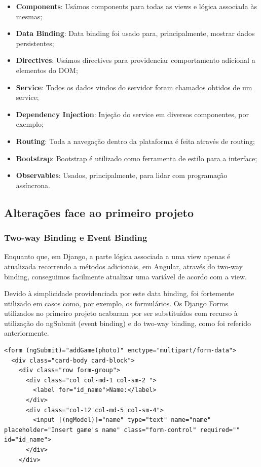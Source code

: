 \documentclass[12pt]{article}
\begin{document}
\begin{itemize}
    \item \textbf{Components}: Usámos components para todas as views e lógica associada às mesmas;
    \item \textbf{Data Binding}: Data binding foi usado para, principalmente, mostrar dados persistentes;
    \item \textbf{Directives}: Usámos directives para providenciar comportamento adicional a elementos do DOM;
    \item \textbf{Service}: Todos os dados vindos do servidor foram chamados obtidos de um service;
    \item \textbf{Dependency Injection}: Injeção do service em diversos componentes, por exemplo;
    \item \textbf{Routing}: Toda a navegação dentro da plataforma é feita através de routing;
    \item \textbf{Bootstrap}: Bootstrap é utilizado como ferramenta de estilo para a interface;
    \item \textbf{Observables}: Usados, principalmente, para lidar com programação assíncrona.
\end{itemize}

\subsection{Alterações face ao primeiro projeto}
\subsubsection{Two-way Binding e Event Binding}
Enquanto que, em Django, a parte lógica associada a uma view apenas é atualizada recorrendo a métodos adicionais, em Angular, através do two-way binding, conseguimos facilmente atualizar uma variável de acordo com a view. 
\par Devido à simplicidade providenciada por este data binding, foi fortemente utilizado em casos como, por exemplo, os formulários. Os Django Forms utilizados no primeiro projeto acabaram por ser substituídos com recurso à utilização do ngSubmit (event binding) e do two-way binding, como foi referido anteriormente.
\clearpage

\begin{lstlisting}[caption={Formulário para adicionar um novo jogo (parcial)},captionpos=b]
<form (ngSubmit)="addGame(photo)" enctype="multipart/form-data">
  <div class="card-body card-block">
    <div class="row form-group">
      <div class="col col-md-1 col-sm-2 ">
        <label for="id_name">Name:</label>
      </div>
      <div class="col-12 col-md-5 col-sm-4">
        <input [(ngModel)]="name" type="text" name="name" placeholder="Insert game's name" class="form-control" required="" id="id_name">
      </div>
    </div>
\end{lstlisting}
\end{document}
